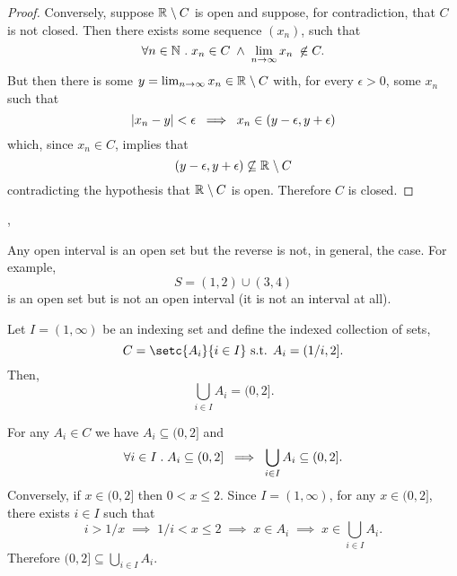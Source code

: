 \documentclass[../MathsNotesBase.tex]{subfiles}
\begin{document}
{\begin{proof}
			\nl
			Conversely, suppose ${ \mathbb{R}^{} \setminus C }$ is open and suppose, for contradiction, that $C$ is not closed. Then there exists some sequence $(x_n)$, such that
			\[ \forall n \in \N{} \logicsep x_n \in C \; \land \; \lim_{n \to \infty} x_n \; \centernot\in C. \]
			But then there is some ${ y = \lim_{n \to \infty} x_n \in \mathbb{R}^{} \setminus C }$ with, for every ${ \epsilon > 0 }$, some $x_n$ such that
			\[ \left\lvert x_n - y\right\rvert < \epsilon \; \implies \; x_n \in (y - \epsilon, y + \epsilon) \]
			which, since ${ x_n \in C }$, implies that
			\[ (y - \epsilon, y + \epsilon) \centernot\subseteq \R{} \setminus C \]
			contradicting the hypothesis that ${ \mathbb{R}^{} \setminus C }$ is open. Therefore $C$ is closed.
		\end{proof}
		
		
		\nl[6]
		\sep
		\begin{exe}
			\ex Any open interval is an open set but the reverse is not, in general, the case. For example,
			\[ S = (1,2) \cup (3,4) \]
			is an open set but is not an open interval (it is not an interval at all).
			
			\bigskip
			\ex Let ${ I = (1,\infty) }$ be an indexing set and define the indexed collection of sets,
			\[ C = \setc{A_i}{i \in I} \suchthat A_i = (1/i, 2]. \]
			Then,
			\[ \bigcup_{i \in I} A_i = (0, 2]. \]
			
			\nl[12]
			For any ${ A_i \in C }$ we have ${ A_i \subseteq (0, 2] }$ and
			\[ \forall i \in I \;.\; A_i \subseteq (0, 2] \; \implies \; \bigcup_{i \in I} A_i \subseteq (0, 2]. \]
			Conversely, if ${ x \in (0, 2] }$ then ${ 0 < x \leq 2 }$. Since ${ I = (1,\infty) }$, for any ${ x \in (0, 2] }$, there exists ${ i \in I }$ such that
			\[ i > 1/x \; \implies \; 1/i < x \leq 2 \; \implies \; x \in A_i \; \implies \; x \in \bigcup_{i \in I} A_i. \]
			Therefore ${ (0, 2] \subseteq \bigcup_{i \in I} A_i }$.
		\end{exe}
		
		
		\nl[16]
		\nl[4]
		
		
}
\end{document}
